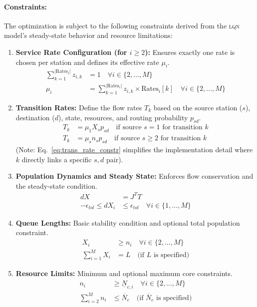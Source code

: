 \documentclass{article}
\newcommand{\lqn}{\textsc{lqn}}
\begin{document}
\paragraph{Constraints:}
The optimization is subject to the following constraints derived from the \lqn{} model's steady-state behavior and resource limitations:
\begin{enumerate}
    \item \textbf{Service Rate Configuration (for \(i \ge 2\)):} Ensures exactly one rate is chosen per station and defines its effective rate \(\mu_i\).
    \begin{align}
        \sum_{k=1}^{|\text{Rates}_i|} z_{i,k} &= 1 \quad \forall i \in \{2, \dots, M\} \\
        \mu_i &= \sum_{k=1}^{|\text{Rates}_i|} z_{i,k} \times \text{Rates}_i[k] \quad \forall i \in \{2, \dots, M\}
    \end{align}
    \item \textbf{Transition Rates:} Define the flow rates \(T_k\) based on the source station (\(s\)), destination (\(d\)), state, resources, and routing probability \(p_{sd}\).
    \begin{align}
        T_k &= \mu_1 X_s p_{sd} \quad \text{if source } s=1 \text{ for transition } k \\
        T_k &= \mu_s n_s p_{sd} \quad \text{if source } s \ge 2 \text{ for transition } k
        \label{eq:trans_rate_constr}
    \end{align}
    (Note: Eq.~\eqref{eq:trans_rate_constr} simplifies the implementation detail where \(k\) directly links a specific \(s,d\) pair).
    \item \textbf{Population Dynamics and Steady State:} Enforces flow conservation and the steady-state condition.
    \begin{align}
        dX &= J^T T \\
        -\epsilon_{tol} \le dX_i &\le \epsilon_{tol} \quad \forall i \in \{1, \dots, M\}
    \end{align}
    \item \textbf{Queue Lengths:} Basic stability condition and optional total population constraint.
    \begin{align}
        X_i &\ge n_i \quad \forall i \in \{2, \dots, M\} \\
        \sum_{i=1}^M X_i &= L \quad \text{(if } L \text{ is specified)}
    \end{align}
    \item \textbf{Resource Limits:} Minimum and optional maximum core constraints.
    \begin{align}
        n_i &\ge \underline{N}_{c,i} \quad \forall i \in \{2, \dots, M\} \\
        \sum_{i=2}^M n_i &\le \overline{N}_{c} \quad \text{(if } \overline{N}_{c} \text{ is specified)}
    \end{align}
\end{enumerate}
\end{document}
